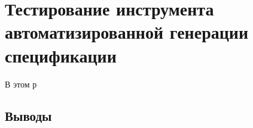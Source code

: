 \chapter{Тестирование инструмента автоматизированной генерации спецификации}

В этом р

\section{Выводы}
